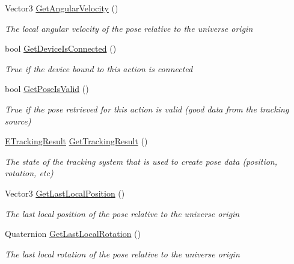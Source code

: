 \begin{DoxyCompactItemize}
Vector3 \mbox{\hyperlink{class_valve_1_1_v_r_1_1_steam_v_r___action___skeleton_af165c26390ceb37afdaf3db442d0d1b3}{Get\+Angular\+Velocity}} ()
\begin{DoxyCompactList}\small\item\em The local angular velocity of the pose relative to the universe origin \end{DoxyCompactList}\item 
bool \mbox{\hyperlink{class_valve_1_1_v_r_1_1_steam_v_r___action___skeleton_a6d53ade526af866579c3d943ba60e6c6}{Get\+Device\+Is\+Connected}} ()
\begin{DoxyCompactList}\small\item\em True if the device bound to this action is connected \end{DoxyCompactList}\item 
bool \mbox{\hyperlink{class_valve_1_1_v_r_1_1_steam_v_r___action___skeleton_a31f87068cc6ae263dce933efbc395cb2}{Get\+Pose\+Is\+Valid}} ()
\begin{DoxyCompactList}\small\item\em True if the pose retrieved for this action is valid (good data from the tracking source) \end{DoxyCompactList}\item 
\mbox{\hyperlink{namespace_valve_1_1_v_r_abe6feab98f33191b7c27b4292012e90a}{E\+Tracking\+Result}} \mbox{\hyperlink{class_valve_1_1_v_r_1_1_steam_v_r___action___skeleton_a83b8c17567b588db367895d688f35df4}{Get\+Tracking\+Result}} ()
\begin{DoxyCompactList}\small\item\em The state of the tracking system that is used to create pose data (position, rotation, etc) \end{DoxyCompactList}\item 
Vector3 \mbox{\hyperlink{class_valve_1_1_v_r_1_1_steam_v_r___action___skeleton_af004d59f2ca4e023411e645e9d8ea472}{Get\+Last\+Local\+Position}} ()
\begin{DoxyCompactList}\small\item\em The last local position of the pose relative to the universe origin \end{DoxyCompactList}\item 
Quaternion \mbox{\hyperlink{class_valve_1_1_v_r_1_1_steam_v_r___action___skeleton_a5b09f26524ff16abff9054915676207d}{Get\+Last\+Local\+Rotation}} ()
\begin{DoxyCompactList}\small\item\em The last local rotation of the pose relative to the universe origin \end{DoxyCompactList}\item 

\end{DoxyCompactItemize}
